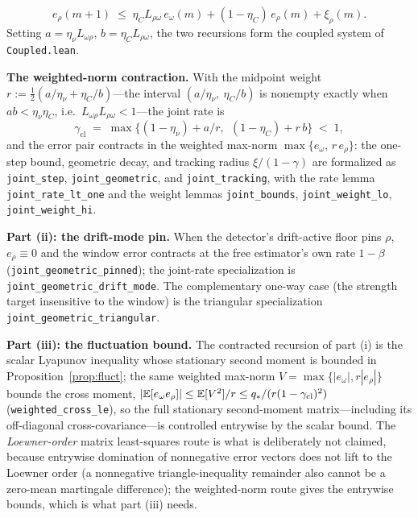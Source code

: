 \[
e_\rho(m{+}1) \;\le\; \eta_C L_{\rho\omega}\, e_\omega(m) + (1-\eta_C)\,e_\rho(m) + \xi_\rho(m).
\]
Setting $a = \eta_\nu L_{\omega\rho}$, $b = \eta_C L_{\rho\omega}$, the two recursions form the coupled system of \texttt{Coupled.lean}.

\textbf{The weighted-norm contraction.}
With the midpoint weight $r := \tfrac12(a/\eta_\nu + \eta_C/b)$---the interval $(a/\eta_\nu,\ \eta_C/b)$ is nonempty exactly when $ab < \eta_\nu\eta_C$, i.e.\ $L_{\omega\rho}L_{\rho\omega} < 1$---the joint rate is
\[
\gamma_{\mathrm{cl}} \;=\; \max\bigl\{(1-\eta_\nu) + a/r,\ \ (1-\eta_C) + r\,b\bigr\} \;<\; 1,
\]
and the error pair contracts in the weighted max-norm $\max\{e_\omega,\, r\,e_\rho\}$: the one-step bound, geometric decay, and tracking radius $\xi/(1-\gamma)$ are formalized as \texttt{joint\_step}, \texttt{joint\_geometric}, and \texttt{joint\_tracking}, with the rate lemma \texttt{joint\_rate\_lt\_one} and the weight lemmas \texttt{joint\_bounds}, \texttt{joint\_weight\_lo}, \texttt{joint\_weight\_hi}.

\textbf{Part (ii): the drift-mode pin.}
When the detector's drift-active floor pins $\rho$, $e_\rho \equiv 0$ and the window error contracts at the free estimator's own rate $1-\beta$ (\texttt{joint\_geometric\_pinned}); the joint-rate specialization is \texttt{joint\_geometric\_drift\_mode}.
The complementary one-way case (the strength target insensitive to the window) is the triangular specialization \texttt{joint\_geometric\_triangular}.

\textbf{Part (iii): the fluctuation bound.}
The contracted recursion of part (i) is the scalar Lyapunov inequality whose stationary second moment is bounded in Proposition~\ref{prop:fluct}; the same weighted max-norm $V = \max\{|e_\omega|, r|e_\rho|\}$ bounds the cross moment, $|\mathbb{E}[e_\omega e_\rho]| \le \mathbb{E}[V^2]/r \le q_*/(r(1-\gamma_{\mathrm{cl}})^2)$ (\texttt{weighted\_cross\_le}), so the full stationary second-moment matrix---including its off-diagonal cross-covariance---is controlled entrywise by the scalar bound. The \emph{Loewner-order} matrix least-squares route is what is deliberately not claimed, because entrywise domination of nonnegative error vectors does not lift to the Loewner order (a nonnegative triangle-inequality remainder also cannot be a zero-mean martingale difference); the weighted-norm route gives the entrywise bounds, which is what part (iii) needs.

